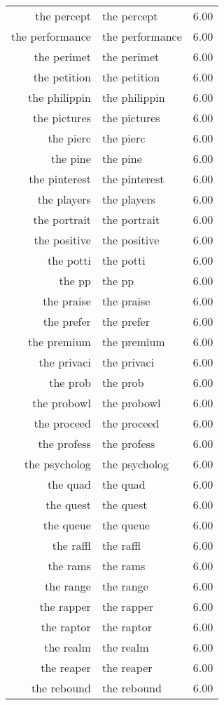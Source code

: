 \begin{table}[ht]
\begin{tabular}{rlr}
  the percept & the percept & 6.00 \\ 
  the performance & the performance & 6.00 \\ 
  the perimet & the perimet & 6.00 \\ 
  the petition & the petition & 6.00 \\ 
  the philippin & the philippin & 6.00 \\ 
  the pictures & the pictures & 6.00 \\ 
  the pierc & the pierc & 6.00 \\ 
  the pine & the pine & 6.00 \\ 
  the pinterest & the pinterest & 6.00 \\ 
  the players & the players & 6.00 \\ 
  the portrait & the portrait & 6.00 \\ 
  the positive & the positive & 6.00 \\ 
  the potti & the potti & 6.00 \\ 
  the pp & the pp & 6.00 \\ 
  the praise & the praise & 6.00 \\ 
  the prefer & the prefer & 6.00 \\ 
  the premium & the premium & 6.00 \\ 
  the privaci & the privaci & 6.00 \\ 
  the prob & the prob & 6.00 \\ 
  the probowl & the probowl & 6.00 \\ 
  the proceed & the proceed & 6.00 \\ 
  the profess & the profess & 6.00 \\ 
  the psycholog & the psycholog & 6.00 \\ 
  the quad & the quad & 6.00 \\ 
  the quest & the quest & 6.00 \\ 
  the queue & the queue & 6.00 \\ 
  the raffl & the raffl & 6.00 \\ 
  the rams & the rams & 6.00 \\ 
  the range & the range & 6.00 \\ 
  the rapper & the rapper & 6.00 \\ 
  the raptor & the raptor & 6.00 \\ 
  the realm & the realm & 6.00 \\ 
  the reaper & the reaper & 6.00 \\ 
  the rebound & the rebound & 6.00 \\ 

\end{tabular}
\end{table}
